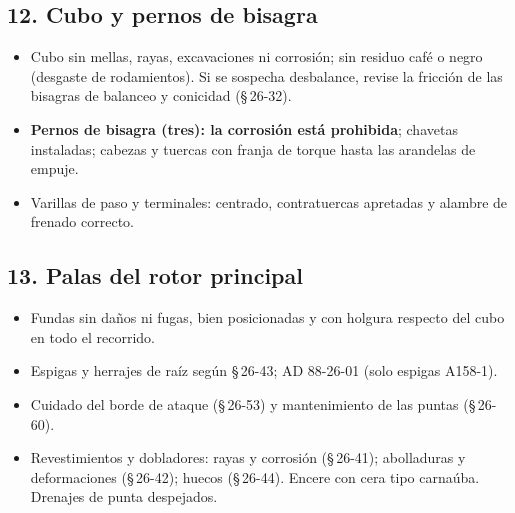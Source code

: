 \subsection*{12. Cubo y pernos de bisagra}
\begin{itemize}
\item Cubo sin mellas, rayas, excavaciones ni corrosión; sin residuo café o negro (desgaste de rodamientos). Si se sospecha desbalance, revise la fricción de las bisagras de balanceo y conicidad (\S\,26-32).
\item \textbf{Pernos de bisagra (tres): la corrosión está prohibida}; chavetas instaladas; cabezas y tuercas con franja de torque hasta las arandelas de empuje.
\item Varillas de paso y terminales: centrado, contratuercas apretadas y alambre de frenado correcto.
\end{itemize}

\subsection*{13. Palas del rotor principal}
\begin{itemize}
\item Fundas sin daños ni fugas, bien posicionadas y con holgura respecto del cubo en todo el recorrido.
\item Espigas y herrajes de raíz según \S\,26-43; AD 88-26-01 (solo espigas A158-1).
\item Cuidado del borde de ataque (\S\,26-53) y mantenimiento de las puntas (\S\,26-60).
\item Revestimientos y dobladores: rayas y corrosión (\S\,26-41); abolladuras y deformaciones (\S\,26-42); huecos (\S\,26-44). Encere con cera tipo carnaúba. Drenajes de punta despejados.
\end{itemize}

